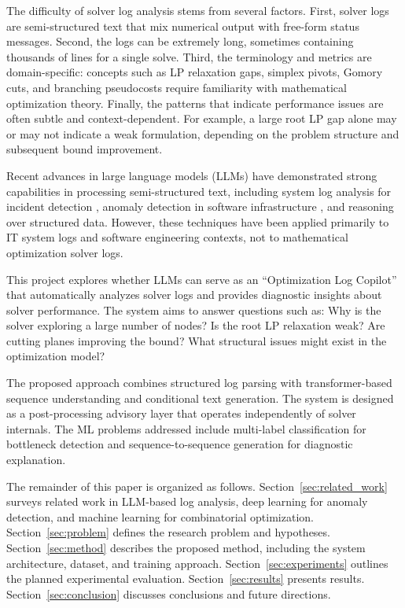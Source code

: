 \documentclass[11pt]{article}
\begin{document}
The difficulty of solver log analysis stems from several factors. First, solver logs are semi-structured text that mix numerical output with free-form status messages. 
Second, the logs can be extremely long, sometimes containing thousands of lines for a single solve. Third, the terminology and metrics are domain-specific: concepts 
such as LP relaxation gaps, simplex pivots, Gomory cuts, and branching pseudocosts require familiarity with mathematical optimization theory. Finally, the patterns 
that indicate performance issues are often subtle and context-dependent. For example, a large root LP gap alone may or may not indicate a weak formulation, depending 
on the problem structure and subsequent bound improvement.

Recent advances in large language models (LLMs) have demonstrated strong capabilities in processing semi-structured text, including system log analysis for 
incident detection \cite{akhtar2025llmbasedeventloganalysis}, anomaly detection in software infrastructure \cite{landauer2023deeplearningloganomaly}, and reasoning 
over structured data. However, these techniques have been applied primarily to IT system logs and software engineering contexts, not to mathematical optimization solver logs.

This project explores whether LLMs can serve as an ``Optimization Log Copilot'' that automatically analyzes solver logs and provides diagnostic insights about solver performance. 
The system aims to answer questions such as: Why is the solver exploring a large number of nodes? Is the root LP relaxation weak? Are cutting planes improving the bound? 
What structural issues might exist in the optimization model?

The proposed approach combines structured log parsing with transformer-based sequence understanding and conditional text generation. The system is designed as a 
post-processing advisory layer that operates independently of solver internals. The ML problems addressed include multi-label classification for bottleneck detection and 
sequence-to-sequence generation for diagnostic explanation.

The remainder of this paper is organized as follows. 
Section~\ref{sec:related_work} surveys related work in LLM-based log analysis, deep learning for anomaly detection, 
and machine learning for combinatorial optimization. 
Section~\ref{sec:problem} defines the research problem and hypotheses. 
Section~\ref{sec:method} describes the proposed method, including the system architecture, dataset, and training approach. 
Section~\ref{sec:experiments} outlines the planned experimental evaluation. 
Section~\ref{sec:results} presents results. 
Section~\ref{sec:conclusion} discusses conclusions and future directions.
\end{document}
